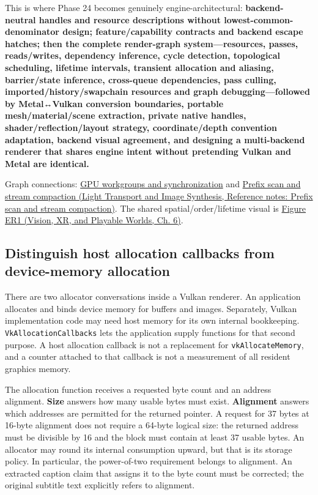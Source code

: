 This is where Phase 24 becomes genuinely engine-architectural: \textbf{backend-neutral handles and resource descriptions without lowest-common-denominator design; feature/capability contracts and backend escape hatches; then the complete render-graph system---resources, passes, reads/writes, dependency inference, cycle detection, topological scheduling, lifetime intervals, transient allocation and aliasing, barrier/state inference, cross-queue dependencies, pass culling, imported/history/swapchain resources and graph debugging---followed by Metal↔Vulkan conversion boundaries, portable mesh/material/scene extraction, private native handles, shader/reflection/layout strategy, coordinate/depth convention adaptation, backend visual agreement, and designing a multi-backend renderer that shares engine intent without pretending Vulkan and Metal are identical.}

Graph connections: \hyperref[appendix-f662b5b1773b]{GPU workgroups and synchronization} and \href{../04-Light-Transport-and-Image-Synthesis/main.pdf\#nameddest=appendix-f2ee4d086415}{Prefix scan and stream compaction (Light Transport and Image Synthesis, Reference notes: Prefix scan and stream compaction)}. The shared spatial/order/lifetime visual is \href{../07-Vision-XR-and-Playable-Worlds/main.pdf\#nameddest=04-visual-computing-ii-ch037-figure-er1---footprint-compositing-order-and-storage-lifetime}{Figure ER1 (Vision, XR, and Playable Worlds, Ch. 6)}.

\subsection{Distinguish host allocation callbacks from device-memory allocation}\label{01-foundations-i-ch016-distinguish-host-allocation-callbacks-from-device-memory-allocation}

There are two allocator conversations inside a Vulkan renderer. An application allocates and binds device memory for buffers and images. Separately, Vulkan implementation code may need host memory for its own internal bookkeeping. \texttt{VkAllocationCallbacks} lets the application supply functions for that second purpose. A host allocation callback is not a replacement for \texttt{vkAllocateMemory}, and a counter attached to that callback is not a measurement of all resident graphics memory.

The allocation function receives a requested byte count and an address alignment. \textbf{Size} answers how many usable bytes must exist. \textbf{Alignment} answers which addresses are permitted for the returned pointer. A request for 37 bytes at 16-byte alignment does not require a 64-byte logical size: the returned address must be divisible by 16 and the block must contain at least 37 usable bytes. An allocator may round its internal consumption upward, but that is its storage policy. In particular, the power-of-two requirement belongs to alignment. An extracted caption claim that assigns it to the byte count must be corrected; the original subtitle text explicitly refers to alignment.

